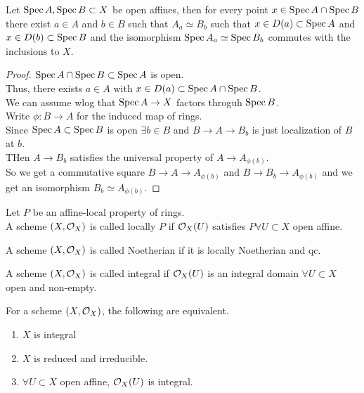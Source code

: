 \documentclass[../main.tex]{subfiles}
\begin{document}
\begin{lemma}
Let $\operatorname{Spec} A, \operatorname{Spec} B \subset X$ be open affines, then for every point $x\in \operatorname{Spec} A \cap \operatorname{Spec} B$ there exist $a\in A$ and $b \in B$ such that $A_a \simeq B_b$ such that $x \in D( a) \subset \operatorname{Spec} A$ and $x\in D( b) \subset \operatorname{Spec} B$ and the isomorphism $\operatorname{Spec} A_a \simeq \operatorname{Spec} B_b$ commutes with the inclusions to $X$.\\
\end{lemma}
\begin{proof}
$\operatorname{Spec} A \cap \operatorname{Spec} B \subset \operatorname{Spec} A$ is open.\\
Thus, there exists $a\in A$ with $x\in D( a) \subset \operatorname{Spec} A \cap \operatorname{Spec} B$.\\
We can assume wlog that $\operatorname{Spec} A \to X $ factors throguh $\operatorname{Spec} B$.\\
Write $\phi: B \to A$ for the induced map of rings.\\
Since $\operatorname{Spec} A \subset \operatorname{Spec} B$ is open $\exists b \in B$ and $B\to A \to B_b$ is just localization of $B$ at $b$.\\
THen $A\to B_b$ satisfies the universal property of $A\to A_{\phi( b) } $.\\
So we get a commutative square $B\to A \to A_{\phi( b) } $ and $B\to B_b \to A_{\phi( b) } $ and we get an isomorphism $B_b \simeq A_{\phi( b) } $.
\end{proof}
\begin{defn}
	Let $P$ be an affine-local property of rings.\\
	A scheme $( X,\mathcal{O}_X) $ is called locally $P$ if $\mathcal{O}_X( U) $ satisfies $P\forall U \subset X$ open affine.
\end{defn}
\begin{defn}
A scheme $( X,\mathcal{O}_X) $ is called Noetherian if it is locally Noetherian and qc.	
\end{defn}
\begin{defn}
A scheme $( X,\mathcal{O}_X) $ is called integral if $\mathcal{O}_X( U) $ is an integral domain $\forall U \subset X$ open and non-empty.	
\end{defn}
\begin{lemma}
For a scheme $( X,\mathcal{O}_X) $, the following are equivalent.
\begin{enumerate}
\item $X$ is integral
\item $X$ is reduced and irreducible.
\item $\forall U \subset X$ open affine, $\mathcal{O}_X( U) $ is integral.
\end{enumerate}
\end{lemma}
\end{document}
